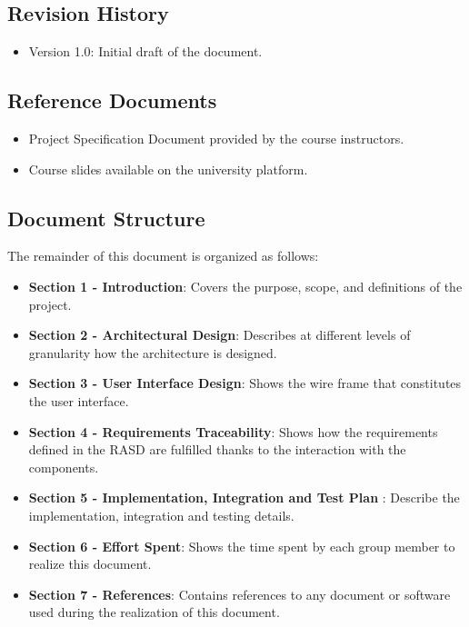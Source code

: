\documentclass[12pt]{article}
\numberwithin{figure}{section}
\numberwithin{table}{section}
\begin{document}
\subsection{Revision History}
\begin{itemize}
    \item Version 1.0: Initial draft of the document.
\end{itemize}

\subsection{Reference Documents}
\begin{itemize}
    \item Project Specification Document provided by the course instructors.
    \item Course slides available on the university platform.
\end{itemize}

\subsection{Document Structure}
The remainder of this document is organized as follows:
\begin{itemize}
    \item \textbf{Section 1 - Introduction}: Covers the purpose, scope, and definitions of the project.
    \item \textbf{Section 2 - Architectural Design}: Describes at different levels of granularity how the architecture is designed.
    \item \textbf{Section 3 - User Interface Design}: Shows the wire frame that constitutes the user interface.
    \item \textbf{Section 4 - Requirements Traceability}: Shows how the requirements defined in the RASD are fulfilled thanks to the interaction with the components.
    \item \textbf{Section 5 - Implementation, Integration and Test Plan }: Describe the implementation, integration and testing details.
    \item \textbf{Section 6 - Effort Spent}: Shows the time spent by each group member to realize this document.
    \item \textbf{Section 7 - References}: Contains references to any document or software used during the realization of this document.
\end{itemize}

\newpage
\end{document}

